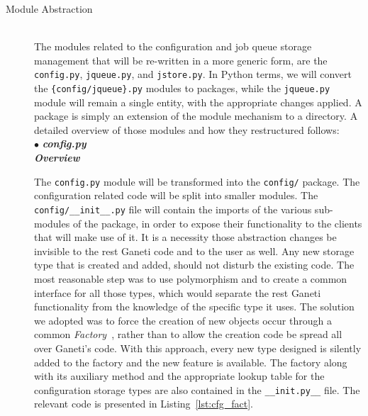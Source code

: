 \begin{description}
  \item[Module Abstraction] \hfill \\
    The modules related to the configuration and job queue storage management
    that will be re-written in a more generic form, are the \texttt{config.py},
    \texttt{jqueue.py}, and \texttt{jstore.py}. In Python terms, we will convert
    the \texttt{\{config/jqueue\}.py} modules to packages, while the
    \texttt{jqueue.py} module will remain a single entity, with the appropriate
    changes applied. A package is simply an extension of the module mechanism to
    a directory. A detailed overview of those modules and how they restructured
    follows: \\

    $\bullet$ \emph{\textbf{{\Large{config.py}}}} \\

    \emph{\textbf{Overview}}

    The \texttt{config.py} module will be transformed into the \texttt{config/}
    package. The configuration related code will be split into smaller modules.
    The \texttt{config/\_\_init\_\_.py} file will contain the imports of the
    various sub-modules of the package, in order to expose their functionality
    to the clients that will make use of it. It is a necessity those
    abstraction changes be invisible to the rest Ganeti code and to the
    user as well. Any new storage type that is created and added, should not
    disturb the existing code. The most reasonable step was to use polymorphism
    and to create a common interface for all those types, which would separate
    the rest Ganeti functionality from the knowledge of the specific type it
    uses. The solution we adopted was to force the creation of new objects
    occur through a common \emph{Factory}~, rather than to
    allow the creation code be spread all over Ganeti's code. With this
    approach, every new type designed is silently added to the factory and the
    new feature is available. The factory along with its auxiliary method and
    the appropriate lookup table for the configuration storage types are also
    contained in the \texttt{\_\_init.py\_\_} file. The relevant code is
    presented in Listing~\ref{lst:cfg_fact}.



\end{description}
